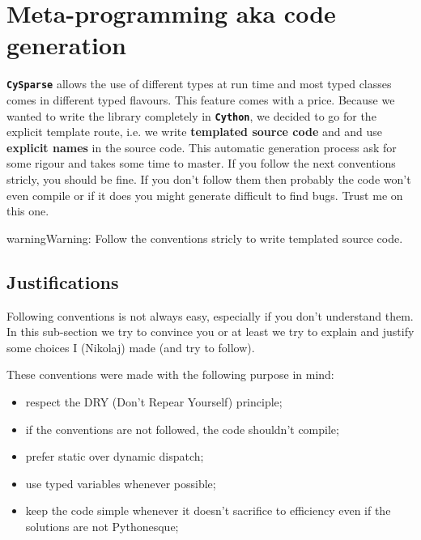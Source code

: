 \documentclass[letterpaper,10pt,english]{sphinxmanual}
\begin{document}
\section{Meta-programming aka code generation}
\label{cysparse_lib_mainteners:meta-programming-aka-code-generation}
\textbf{\texttt{CySparse}} allows the use of different types at run time and most typed classes comes in different typed flavours. This feature comes with a price. Because we wanted to write the library completely
in \textbf{\texttt{Cython}}, we decided to go for the explicit template route, i.e. we write \textbf{templated source code} and and use \textbf{explicit names} in the source code.
This automatic generation process ask for some rigour and takes some time to master. If you follow the next conventions stricly, you should be fine. If you don't follow them then probably the code won't even compile or
if it does you might generate difficult to find bugs. Trust me on this one.

\begin{notice}{warning}{Warning:}
Follow the conventions stricly to write templated source code.
\end{notice}


\subsection{Justifications}
\label{cysparse_lib_mainteners:justifications}
Following conventions is not always easy, especially if you don't understand them. In this sub-section we try to convince you or at least we try to explain and justify some choices I (Nikolaj) made (and try to follow).

These conventions were made with the following purpose in mind:
\begin{itemize}
\item {} 
respect the DRY (Don't Repear Yourself) principle;

\item {} 
if the conventions are not followed, the code shouldn't compile;

\item {} 
prefer static over dynamic dispatch;

\item {} 
use typed variables whenever possible;

\item {} 
keep the code simple whenever it doesn't sacrifice to efficiency even if the solutions are not Pythonesque;

\end{itemize}
\end{document}
